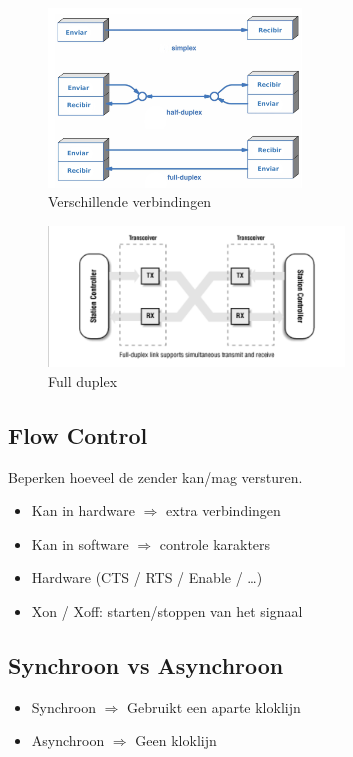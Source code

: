 \documentclass{article}
\begin{document}
\begin{figure}[H]
    \centering
    \includegraphics[width=0.6\textwidth]{Screenshot_20200323_115925.png}
    \caption{Verschillende verbindingen}
\end{figure}

\begin{figure}[H]
    \centering
    \includegraphics[width=0.7\textwidth]{Screenshot_20200323_120141.png}
    \caption{Full duplex}
\end{figure}

\subsection{Flow Control}
Beperken hoeveel de zender kan/mag versturen.

\begin{itemize}
    \item Kan in hardware $\Rightarrow$ extra verbindingen
    \item Kan in software $\Rightarrow$ controle karakters
    \item Hardware (CTS / RTS / Enable / \dots)
    \item Xon / Xoff: starten/stoppen van het signaal
\end{itemize}

\subsection{Synchroon vs Asynchroon}
\begin{itemize}
    \item Synchroon $\Rightarrow$ Gebruikt een aparte kloklijn
    \item Asynchroon $\Rightarrow$ Geen kloklijn
\end{itemize}
\end{document}
